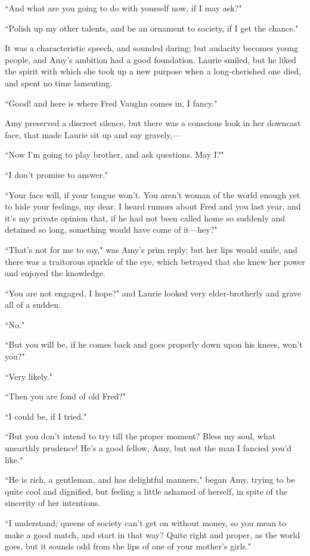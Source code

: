 ``And what are you going to do with yourself now, if I may ask?"

``Polish up my other talents, and be an ornament to society, if I get the
chance."

It was a characteristic speech, and sounded daring; but audacity becomes
young people, and Amy's ambition had a good foundation.
Laurie smiled, but he liked the spirit with which she took up a new
purpose when a long-cherished one died, and spent no time lamenting.

``Good! and here is where Fred Vaughn comes in, I fancy."

Amy preserved a discreet silence, but there was a conscious look in her
downcast face, that made Laurie sit up and say gravely,---

``Now I'm going to play brother, and ask questions. May
I?"

``I don't promise to answer."

``Your face will, if your tongue won't. You
aren't woman of the world enough yet to hide your
feelings, my dear. I heard rumors about Fred and you last year, and
it's my private opinion that, if he had not been called
home so suddenly and detained so long, something would have come of
it---hey?"

``That's not for me to say," was Amy's
prim reply; but her lips would smile, and there was a traitorous sparkle
of the eye, which betrayed that she knew her power and enjoyed the
knowledge.

``You are not engaged, I hope?" and Laurie looked very elder-brotherly
and grave all of a sudden.

``No."

``But you will be, if he comes back and goes properly down upon his
knees, won't you?"

``Very likely."

``Then you are fond of old Fred?"

``I could be, if I tried."

``But you don't intend to try till the proper moment?
Bless my soul, what unearthly prudence! He's a good
fellow, Amy, but not the man I fancied you'd like."

``He is rich, a gentleman, and has delightful manners," began Amy, trying
to be quite cool and dignified, but feeling a little ashamed of herself,
in spite of the sincerity of her intentions.

``I understand; queens of society can't get on without
money, so you mean to make a good match, and start in that way? Quite
right and proper, as the world goes, but it sounds odd from the lips of
one of your mother's girls."

